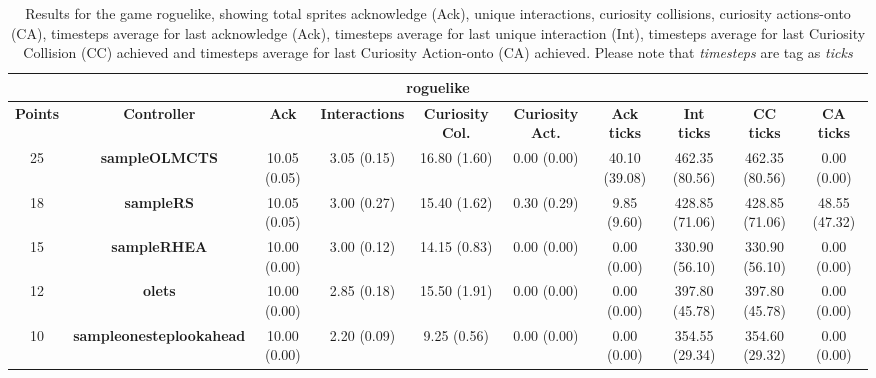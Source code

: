 \begin{table*}[!t]
\begin{center}
\begin{adjustbox}{width=1\textwidth}
\begin{tabular}{|c|c|c|c|c|c|c|c|c|c|}
\multicolumn{10}{c}{\textbf{roguelike}}\\
\hline
\textbf{Points} & \textbf{Controller} & \textbf{Ack} & \textbf{Interactions} & \textbf{Curiosity Col.} & \textbf{Curiosity Act.} & \textbf{Ack ticks} & \textbf{Int ticks} & \textbf{CC ticks} & \textbf{CA ticks}\\
\hline
25 & \textbf{sampleOLMCTS} & 10.05 (0.05) & 3.05 (0.15) & 16.80 (1.60) & 0.00 (0.00) & 40.10 (39.08) & 462.35 (80.56) & 462.35 (80.56) & 0.00 (0.00)
 \\
\hline
18 & \textbf{sampleRS} & 10.05 (0.05) & 3.00 (0.27) & 15.40 (1.62) & 0.30 (0.29) & 9.85 (9.60) & 428.85 (71.06) & 428.85 (71.06) & 48.55 (47.32)
 \\
\hline
15 & \textbf{sampleRHEA} & 10.00 (0.00) & 3.00 (0.12) & 14.15 (0.83) & 0.00 (0.00) & 0.00 (0.00) & 330.90 (56.10) & 330.90 (56.10) & 0.00 (0.00)
 \\
\hline
12 & \textbf{olets} & 10.00 (0.00) & 2.85 (0.18) & 15.50 (1.91) & 0.00 (0.00) & 0.00 (0.00) & 397.80 (45.78) & 397.80 (45.78) & 0.00 (0.00)
 \\
\hline
10 & \textbf{sampleonesteplookahead} & 10.00 (0.00) & 2.20 (0.09) & 9.25 (0.56) & 0.00 (0.00) & 0.00 (0.00) & 354.55 (29.34) & 354.60 (29.32) & 0.00 (0.00)
 \\
\hline
\end{tabular}
\end{adjustbox}
\caption{Results for the game roguelike, showing total sprites acknowledge (Ack), unique interactions, curiosity collisions, curiosity actions-onto (CA), timesteps average for last acknowledge (Ack),  timesteps average for last unique interaction (Int), timesteps average for last Curiosity Collision (CC) achieved and timesteps average for last Curiosity Action-onto (CA) achieved. Please note that \textit{timesteps} are tag as \textit{ticks}}
\label{tab:weights}
\end{center}
\end{table*}

